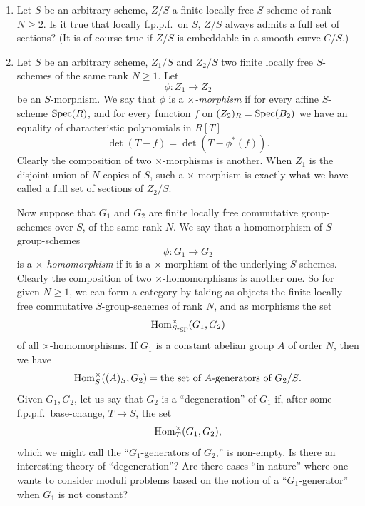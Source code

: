 \begin{enumerate}[\bf 1.]
\item Let $S$ be an arbitrary scheme, $Z/S$ a finite locally free $S$-scheme of rank $N \ge 2$. Is it true that locally f.p.p.f.\ on $S$, $Z/S$ always admits a full set of sections? (It is of course true if $Z/S$ is embeddable in a smooth curve $C/S$.)

\item Let $S$ be an arbitrary scheme, $Z_1/S$ and $Z_2/S$ two finite locally free $S$-schemes of the same rank $N \ge 1$. Let
\[
\phi \colon Z_1 \longrightarrow Z_2
\]
be an $S$-morphism. We say that $\phi$ is a \emph{$\times$-morphism} if for every affine $S$-scheme $\operatorname{Spec}(R)$, and for every function $f$ on $(Z_2)_R = \operatorname{Spec}(B_2)$ we have an equality of characteristic polynomials in $R[T]$
\[
\det(T - f) = \det(T - \phi^*(f)).
\]
Clearly the composition of two $\times$-morphisms is another. When $Z_1$ is the disjoint union of $N$ copies of $S$, such a $\times$-morphism is exactly what we have called a full set of sections of $Z_2/S$.

Now suppose that $G_1$ and $G_2$ are finite locally free commutative group-schemes over $S$, of the same rank $N$. We say that a homomorphism of $S$-group-schemes
\[
\phi \colon G_1 \longrightarrow G_2
\]
is a \emph{$\times$-homomorphism} if it is a $\times$-morphism of the underlying $S$-schemes. Clearly the composition of two $\times$-homomorphisms is another one. So for given $N \ge 1$, we can form a category by taking as objects the finite locally free commutative $S$-group-schemes of rank $N$, and as morphisms the set
\[
\operatorname{Hom}_{S\text{\rm -gp}}^\times(G_1, G_2)
\]
of all $\times$-homomorphisms. If $G_1$ is a constant abelian group $A$ of order $N$, then we have
\[
\operatorname{Hom}_S^\times((A)_S, G_2) = \text{the set of $A$-generators of $G_2/S$}.
\]
Given $G_1, G_2$, let us say that $G_2$ is a ``degeneration'' of $G_1$ if, after some f.p.p.f.\ base-change, $T \to S$, the set
\[
\operatorname{Hom}_T^\times(G_1, G_2),
\]
which we might call the ``$G_1$-generators of $G_2$,'' is non-empty. Is there an interesting theory of ``degeneration''? Are there cases ``in nature'' where one wants to consider moduli problems based on the notion of a ``$G_1$-generator'' when $G_1$ is not constant?
\end{enumerate}
